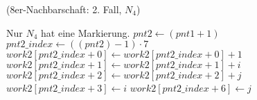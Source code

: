 \begin{algorithm}[ht]
\caption{ (8er-Nachbarschaft: 2. Fall, $N_4$)}
\label{alg:arlabeling-neighbour-case2-3}
\begin{algorithmic}[1]
	\State \Comment Nur $N_4$ hat eine Markierung.
	\State $\mathit{pnt2} \gets \left(\mathit{pnt1} + 1\right)$
	\label{alg:arlabeling-neighbour-case2-3-n4}
	\State $\mathit{pnt2\_index} \gets \left(\left(\mathit{pnt2}\right) - 1\right) \cdot 7$
	\State $\mathit{work2}\left[\mathit{pnt2\_index} + 0\right] \gets \mathit{work2}\left[\mathit{pnt2\_index} + 0\right] + 1$
	\label{alg:arlabeling-neighbour-case2-3-incregion}
	\State $\mathit{work2}\left[\mathit{pnt2\_index} + 1\right] \gets \mathit{work2}\left[\mathit{pnt2\_index} + 1\right] + i$
	\State $\mathit{work2}\left[\mathit{pnt2\_index} + 2\right] \gets \mathit{work2}\left[\mathit{pnt2\_index} + 2\right] + j$
	\label{alg:arlabeling-neighbour-case2-3-isismaller}
		\State $\mathit{work2}\left[\mathit{pnt2\_index} + 3\right] \gets i$
		\label{alg:arlabeling-neighbour-case2-3-newi}
	\EndIf
	\State $\mathit{work2}\left[\mathit{pnt2\_index} + 6\right] \gets j$
\end{algorithmic}
\end{algorithm}
